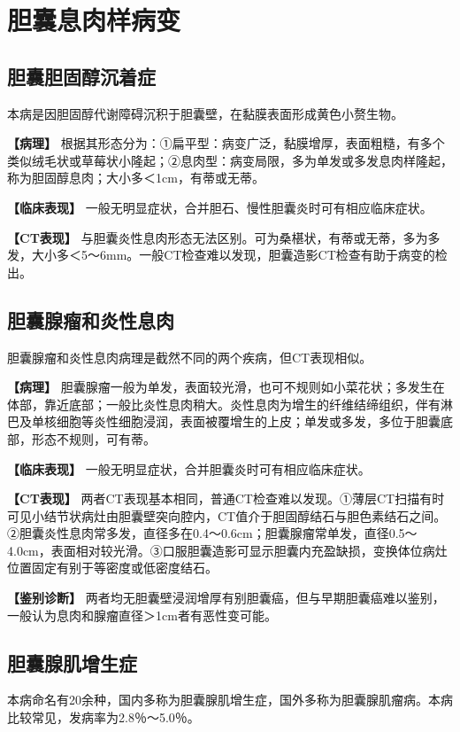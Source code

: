 \section{胆囊息肉样病变}

\subsection{胆囊胆固醇沉着症}

本病是因胆固醇代谢障碍沉积于胆囊壁，在黏膜表面形成黄色小赘生物。

\textbf{【病理】}
根据其形态分为：①扁平型：病变广泛，黏膜增厚，表面粗糙，有多个类似绒毛状或草莓状小隆起；②息肉型：病变局限，多为单发或多发息肉样隆起，称为胆固醇息肉；大小多＜1cm，有蒂或无蒂。

\textbf{【临床表现】}
一般无明显症状，合并胆石、慢性胆囊炎时可有相应临床症状。

\textbf{【CT表现】}
与胆囊炎性息肉形态无法区别。可为桑椹状，有蒂或无蒂，多为多发，大小多＜5～6mm。一般CT检查难以发现，胆囊造影CT检查有助于病变的检出。

\subsection{胆囊腺瘤和炎性息肉}

胆囊腺瘤和炎性息肉病理是截然不同的两个疾病，但CT表现相似。

\textbf{【病理】}
胆囊腺瘤一般为单发，表面较光滑，也可不规则如小菜花状；多发生在体部，靠近底部；一般比炎性息肉稍大。炎性息肉为增生的纤维结缔组织，伴有淋巴及单核细胞等炎性细胞浸润，表面被覆增生的上皮；单发或多发，多位于胆囊底部，形态不规则，可有蒂。

\textbf{【临床表现】} 一般无明显症状，合并胆囊炎时可有相应临床症状。

\textbf{【CT表现】}
两者CT表现基本相同，普通CT检查难以发现。①薄层CT扫描有时可见小结节状病灶由胆囊壁突向腔内，CT值介于胆固醇结石与胆色素结石之间。②胆囊炎性息肉常多发，直径多在0.4～0.6cm；胆囊腺瘤常单发，直径0.5～4.0cm，表面相对较光滑。③口服胆囊造影可显示胆囊内充盈缺损，变换体位病灶位置固定有别于等密度或低密度结石。

\textbf{【鉴别诊断】}
两者均无胆囊壁浸润增厚有别胆囊癌，但与早期胆囊癌难以鉴别，一般认为息肉和腺瘤直径＞1cm者有恶性变可能。

\subsection{胆囊腺肌增生症}

本病命名有20余种，国内多称为胆囊腺肌增生症，国外多称为胆囊腺肌瘤病。本病比较常见，发病率为2.8％～5.0％。


